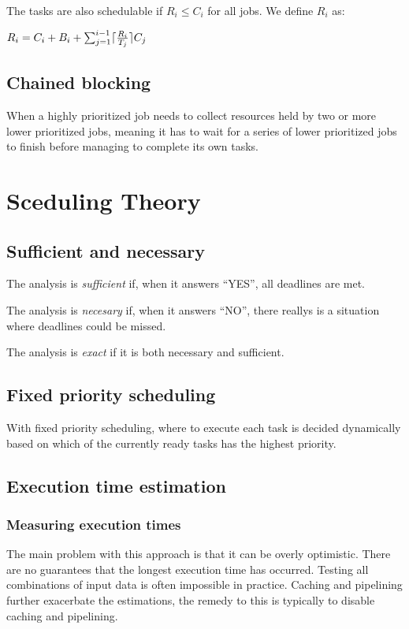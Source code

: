 \documentclass[a4paper]{article}
\DeclarePairedDelimiter{\ceil}{\lceil}{\rceil}
\begin{document}
The tasks are also schedulable if $R_i \leq C_i$ for all jobs. We define $R_i$ as:

\begin{center}
  $R_i = C_i + B_i + \sum_{j=1}^{i-1} \ceil{\frac{R_i}{T_j}}C_j$
\end{center}

\subsection{Chained blocking}
When a highly prioritized job needs to collect resources held by two or more
lower prioritized jobs, meaning it has to wait for a series of lower prioritized
jobs to finish before managing to complete its own tasks.

\section{Sceduling Theory}
\subsection{Sufficient and necessary}
The analysis is \emph{sufficient} if, when it answers ``YES'', all deadlines
are met.

The analysis is \emph{necesary} if, when it answers ``NO'', there reallys is a
situation where deadlines could be missed.

The analysis is \emph{exact} if it is both necessary and sufficient.

\subsection{Fixed priority scheduling}
With fixed priority scheduling, where to execute each task is decided
dynamically based on which of the currently ready tasks has the highest
priority.

\subsection{Execution time estimation}

\subsubsection{Measuring execution times}
The main problem with this approach is that it can be overly optimistic.
There are no guarantees that the longest execution time has occurred.
Testing all combinations of input data is often impossible in practice.
Caching and pipelining further exacerbate the estimations, the remedy to this
is typically to disable caching and pipelining.
\end{document}
